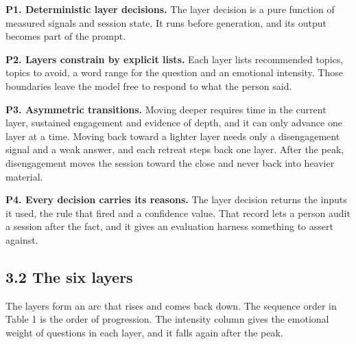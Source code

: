 \documentclass[11pt]{article}
\begin{document}
\textbf{P1. Deterministic layer decisions.} The layer decision is a pure
function of measured signals and session state. It runs before
generation, and its output becomes part of the prompt.

\textbf{P2. Layers constrain by explicit lists.} Each layer lists
recommended topics, topics to avoid, a word range for the question and
an emotional intensity. Those boundaries leave the model free to respond
to what the person said.

\textbf{P3. Asymmetric transitions.} Moving deeper requires time in the
current layer, sustained engagement and evidence of depth, and it can
only advance one layer at a time. Moving back toward a lighter layer
needs only a disengagement signal and a weak answer, and each retreat
steps back one layer. After the peak, disengagement moves the session
toward the close and never back into heavier material.

\textbf{P4. Every decision carries its reasons.} The layer decision
returns the inputs it used, the rule that fired and a confidence value.
That record lets a person audit a session after the fact, and it gives
an evaluation harness something to assert against.

\subsection{3.2 The six layers}

The layers form an arc that rises and comes back down. The sequence
order in Table 1 is the order of progression. The intensity column gives
the emotional weight of questions in each layer, and it falls again
after the peak.
\end{document}
